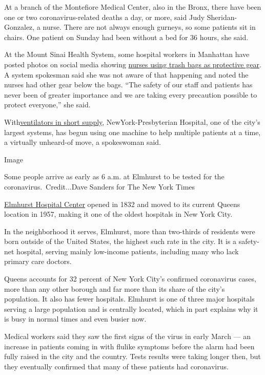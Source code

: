 At a branch of the Montefiore Medical Center, also in the Bronx, there
have been one or two coronavirus-related deaths a day, or more, said
Judy Sheridan-Gonzalez, a nurse. There are not always enough gurneys, so
some patients sit in chairs. One patient on Sunday had been without a
bed for 36 hours, she said.

At the Mount Sinai Health System, some hospital workers in Manhattan
have posted photos on social media showing
\href{https://twitter.com/brianmrosenthal/status/1241744193648762882}{nurses
using trash bags as protective gear}. A system spokesman said she was
not aware of that happening and noted the nurses had other gear below
the bags. ``The safety of our staff and patients has never been of
greater importance and we are taking every precaution possible to
protect everyone,'' she said.

With\href{https://www.nytimes3xbfgragh.onion/video/us/politics/100000007051271/cuomo-coronavirus-update.html}{ventilators
in short supply}, NewYork-Presbyterian Hospital, one of the city's
largest systems, has begun using one machine to help multiple patients
at a time, a virtually unheard-of move, a spokeswoman said.

Image

Some people arrive as early as 6 a.m. at Elmhurst to be tested for the
coronavirus.~Credit...Dave Sanders for The New York Times

\href{https://www.nychealthandhospitals.org/wp-content/uploads/2016/07/chna-elmhurst-2013.pdf}{Elmhurst
Hospital Center} opened in 1832 and moved to its current Queens location
in 1957, making it one of the oldest hospitals in New York City.

In the neighborhood it serves, Elmhurst, more than two-thirds of
residents were born outside of the United States, the highest such rate
in the city. It is a safety-net hospital, serving mainly low-income
patients, including many who lack primary care doctors.

Queens accounts for 32 percent of New York City's confirmed coronavirus
cases, more than any other borough and far more than its share of the
city's population. It also has fewer hospitals. Elmhurst is one of three
major hospitals serving a large population and is centrally located,
which in part explains why it is busy in normal times and even busier
now.

Medical workers said they saw the first signs of the virus in early
March --- an increase in patients coming in with flulike symptoms before
the alarm had been fully raised in the city and the country. Tests
results were taking longer then, but they eventually confirmed that many
of these patients had coronavirus.

